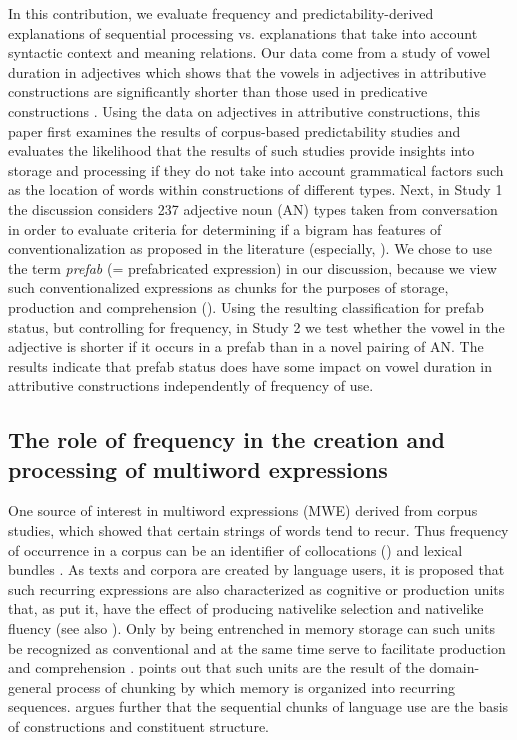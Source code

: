 \documentclass[output=paper]{langscibook}
\begin{document}
In this contribution, we evaluate frequency and predictability-derived explanations of sequential processing vs. explanations that take into account syntactic context and meaning relations. Our data come from a study of vowel duration in adjectives which shows that the vowels in adjectives in attributive constructions are significantly shorter than those used in predicative constructions \citep{BybeeSouza2019}. Using the data on adjectives in attributive constructions, this paper first examines the results of corpus-based predictability studies and evaluates the likelihood that the results of such studies provide insights into storage and processing if they do not take into account grammatical factors such as the location of words within constructions of different types. Next, in Study 1 the discussion considers 237 adjective noun (AN) types taken from conversation in order to evaluate criteria for determining if a bigram has features of conventionalization as proposed in the literature (especially, \citealt{PawleySyder1983,ErmanWarren2000,Wray2002,CorriganEtAl2009}). We chose to use the term \textit{prefab} (= prefabricated expression) in our discussion, because we view such conventionalized expressions as chunks for the purposes of storage, production and comprehension (\citealt{Bybee1998,Bybee2010,Bybee1998}). Using the resulting classification for prefab status, but controlling for frequency, in Study 2 we test whether the vowel in the adjective is shorter if it occurs in a prefab than in a novel pairing of AN. The results indicate that prefab status does have some impact on vowel duration in attributive constructions independently of frequency of use. 

\subsection{The role of frequency in the creation and processing of multiword expressions} 

One source of interest in multiword expressions (MWE) derived from corpus studies, which showed that certain strings of words tend to recur. Thus frequency of occurrence in a corpus can be an identifier of collocations (\citealt{JonesSinclair1974}) and lexical bundles \citep{BiberEtAl1999}. As texts and corpora are created by language users, it is proposed that such recurring expressions are also characterized as cognitive or production units that, as \citet{PawleySyder1983} put it, have the effect of producing nativelike selection and nativelike fluency (see also \citealt{Siyanova-ChanturiaMartinez2015}). Only by being entrenched in memory storage can such units be recognized as conventional and at the same time serve to facilitate production and comprehension \citep{Langacker2008}. \citet{Ellis1996} points out that such units are the result of the domain-general process of chunking by which memory is organized into recurring sequences. \citet{Bybee1998, Bybee2002, Bybee2010} argues further that the sequential chunks of language use are the basis of constructions and constituent structure. 
\end{document}
